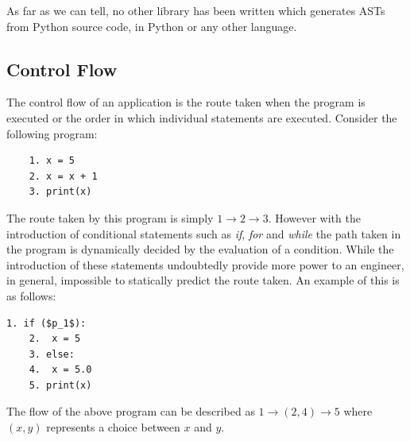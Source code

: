 \documentclass[12pt, titlepage]{article}
\begin{document}
\indent As far as we can tell, no other library has been written which generates ASTs from Python source code, in Python or any other language.

\subsection{Control Flow}
The control flow of an application is the route taken when the program is executed or the order in which individual statements are executed. Consider the following program:
\begin{lstlisting}
	1. x = 5
	2. x = x + 1
	3. print(x)
\end{lstlisting}
The route taken by this program is simply $1 \rightarrow 2 \rightarrow 3$. However with the introduction of conditional statements such as \textit{if}, \textit{for} and \textit{while} the path taken in the program is dynamically decided by the evaluation of a condition. While the introduction of these statements undoubtedly provide more power to an engineer, in general, impossible to statically predict the route taken. An example of this is as follows:
\begin{lstlisting}[mathescape]
	1. if ($p_1$):
	2. 	x = 5
	3. else:
	4. 	x = 5.0
	5. print(x)
\end{lstlisting}
The flow of the above program can be described as $1 \rightarrow (2, 4) \rightarrow 5$ where $(x, y)$ represents a choice between $x$ and $y$.
\end{document}
